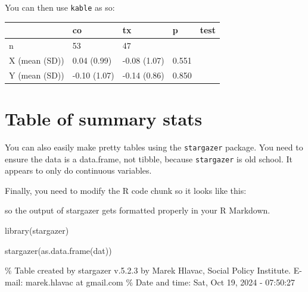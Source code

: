 \documentclass[
  letterpaper,
  DIV=11,
  numbers=noendperiod]{scrreprt}
\newenvironment{Shaded}{}{}
\newcommand{\AttributeTok}[1]{\textcolor[rgb]{0.49,0.56,0.16}{#1}}
\newcommand{\ConstantTok}[1]{\textcolor[rgb]{0.53,0.00,0.00}{#1}}
\newcommand{\FunctionTok}[1]{\textcolor[rgb]{0.02,0.16,0.49}{#1}}
\newcommand{\NormalTok}[1]{#1}
\newcommand{\SpecialCharTok}[1]{\textcolor[rgb]{0.25,0.44,0.63}{#1}}
\begin{document}
You can then use \texttt{kable} as so:

\begin{Shaded}
\end{Shaded}

\begin{longtable}[]{@{}lllll@{}}
\toprule\noalign{}
& co & tx & p & test \\
\midrule\noalign{}
\endhead
\bottomrule\noalign{}
\endlastfoot
n & 53 & 47 & & \\
X (mean (SD)) & 0.04 (0.99) & -0.08 (1.07) & 0.551 & \\
Y (mean (SD)) & -0.10 (1.07) & -0.14 (0.86) & 0.850 & \\
\end{longtable}

\section{Table of summary stats}\label{table-of-summary-stats}

You can also easily make pretty tables using the \texttt{stargazer}
package. You need to ensure the data is a data.frame, not tibble,
because \texttt{stargazer} is old school. It appears to only do
continuous variables.

Finally, you need to modify the R code chunk so it looks like this:

so the output of stargazer gets formatted properly in your R Markdown.

\begin{Shaded}
\begin{Highlighting}[]
\FunctionTok{library}\NormalTok{(stargazer)}

\FunctionTok{stargazer}\NormalTok{(}\FunctionTok{as.data.frame}\NormalTok{(dat))}
\end{Highlighting}
\end{Shaded}

\% Table created by stargazer v.5.2.3 by Marek Hlavac, Social Policy
Institute. E-mail: marek.hlavac at gmail.com \% Date and time: Sat, Oct
19, 2024 - 07:50:27
\end{document}
